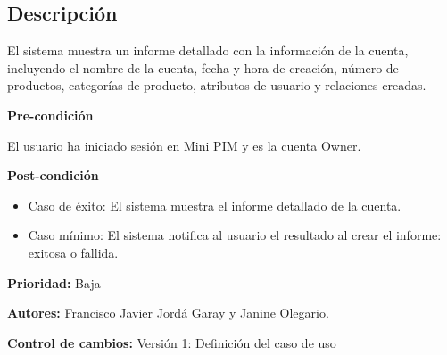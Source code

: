 
\subsection*{Descripción}
El sistema muestra un informe detallado con la información de la cuenta, incluyendo el
nombre de la cuenta, fecha y hora de creación, número de productos, categorías 
de producto, atributos de usuario y relaciones creadas.

\vspace{0.15cm}

\textbf{Pre-condición}\par
El usuario ha iniciado sesión en Mini PIM y es la cuenta Owner.\par
\vspace{0.15cm}

\textbf{Post-condición}
\begin{itemize}
    \item Caso de éxito: El sistema muestra el informe detallado de la cuenta.
    \item Caso mínimo: El sistema notifica al usuario el resultado al crear el informe: exitosa o fallida.
\end{itemize}

\textbf{Prioridad:}
Baja
\vspace{0.15cm}

\textbf{Autores: }
Francisco Javier Jordá Garay y Janine Olegario.\par
\vspace{0.15cm}

\textbf{Control de cambios: } Versión 1: Definición del caso de uso

